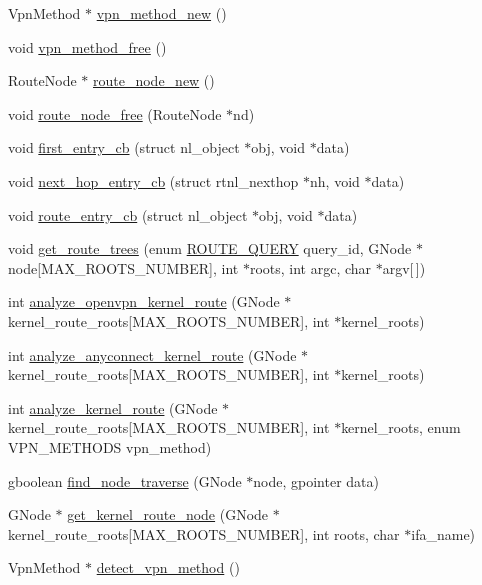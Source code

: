 \begin{DoxyCompactItemize}
\item 
Vpn\+Method $\ast$ \hyperlink{route-tree_8c_a3ccbf1b413fe282c1490701f739273a8}{vpn\+\_\+method\+\_\+new} ()
\item 
void \hyperlink{route-tree_8c_a06257b65d43c86e35b44ae0d91b226cf}{vpn\+\_\+method\+\_\+free} ()
\item 
Route\+Node $\ast$ \hyperlink{route-tree_8c_a941ed51572db1d1d4720f8a329dd0d8b}{route\+\_\+node\+\_\+new} ()
\item 
void \hyperlink{route-tree_8c_a1b80d492072ee18f906bdd2fbaad9b4b}{route\+\_\+node\+\_\+free} (Route\+Node $\ast$nd)
\item 
void \hyperlink{route-tree_8c_ac750dd5c6890dd949d1029d4363fa0e0}{first\+\_\+entry\+\_\+cb} (struct nl\+\_\+object $\ast$obj, void $\ast$data)
\item 
void \hyperlink{route-tree_8c_a8402c2baca9819b3791b35b6c1645ce6}{next\+\_\+hop\+\_\+entry\+\_\+cb} (struct rtnl\+\_\+nexthop $\ast$nh, void $\ast$data)
\item 
void \hyperlink{route-tree_8c_a112b373b8e4a4a0eacfba3cc078e5ce2}{route\+\_\+entry\+\_\+cb} (struct nl\+\_\+object $\ast$obj, void $\ast$data)
\item 
void \hyperlink{route-tree_8c_a7e256826bca6c828a8564f27f84dd517}{get\+\_\+route\+\_\+trees} (enum \hyperlink{route-tree_8c_aed8cdbb52dbe32c343a8c26887888e7f}{R\+O\+U\+T\+E\+\_\+\+Q\+U\+E\+RY} query\+\_\+id, G\+Node $\ast$node\mbox{[}M\+A\+X\+\_\+\+R\+O\+O\+T\+S\+\_\+\+N\+U\+M\+B\+ER\mbox{]}, int $\ast$roots, int argc, char $\ast$argv\mbox{[}$\,$\mbox{]})
\item 
int \hyperlink{route-tree_8c_a023982baea4d991af1755c75365e6070}{analyze\+\_\+openvpn\+\_\+kernel\+\_\+route} (G\+Node $\ast$kernel\+\_\+route\+\_\+roots\mbox{[}M\+A\+X\+\_\+\+R\+O\+O\+T\+S\+\_\+\+N\+U\+M\+B\+ER\mbox{]}, int $\ast$kernel\+\_\+roots)
\item 
int \hyperlink{route-tree_8c_ad4fe4de0af6177aad9c1936fcaa1d988}{analyze\+\_\+anyconnect\+\_\+kernel\+\_\+route} (G\+Node $\ast$kernel\+\_\+route\+\_\+roots\mbox{[}M\+A\+X\+\_\+\+R\+O\+O\+T\+S\+\_\+\+N\+U\+M\+B\+ER\mbox{]}, int $\ast$kernel\+\_\+roots)
\item 
int \hyperlink{route-tree_8c_a5a490e2e29be18ae630572e3776539af}{analyze\+\_\+kernel\+\_\+route} (G\+Node $\ast$kernel\+\_\+route\+\_\+roots\mbox{[}M\+A\+X\+\_\+\+R\+O\+O\+T\+S\+\_\+\+N\+U\+M\+B\+ER\mbox{]}, int $\ast$kernel\+\_\+roots, enum V\+P\+N\+\_\+\+M\+E\+T\+H\+O\+DS vpn\+\_\+method)
\item 
gboolean \hyperlink{route-tree_8c_a3a0eeaa4d6b227ed8aa19e5d56096cd3}{find\+\_\+node\+\_\+traverse} (G\+Node $\ast$node, gpointer data)
\item 
G\+Node $\ast$ \hyperlink{route-tree_8c_a77affcaa875961893c05c7e211678ed1}{get\+\_\+kernel\+\_\+route\+\_\+node} (G\+Node $\ast$kernel\+\_\+route\+\_\+roots\mbox{[}M\+A\+X\+\_\+\+R\+O\+O\+T\+S\+\_\+\+N\+U\+M\+B\+ER\mbox{]}, int roots, char $\ast$ifa\+\_\+name)
\item 
Vpn\+Method $\ast$ \hyperlink{route-tree_8c_a267529614de44218b8187f3ac46ce46f}{detect\+\_\+vpn\+\_\+method} ()
\end{DoxyCompactItemize}



